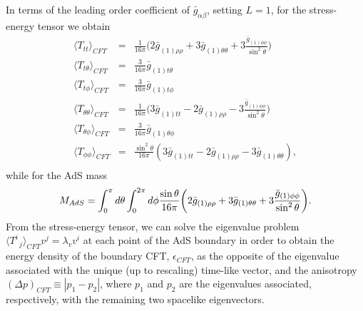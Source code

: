 \documentclass[a4paper,11pt]{article}
\begin{document}
In terms of the leading order coefficient of $\bar{g}_{\alpha\beta}$, setting $L=1$, for the stress-energy tensor we obtain
\begin{eqnarray}
\langle T_{tt}\rangle_{CFT}&=&\frac{1}{16\pi} \biggl(2\bar{g}_{(1)\rho\rho}+3\bar{g}_{(1)\theta\theta}+3\frac{\bar{g}_{(1)\phi\phi}}{\sin^2\theta}\biggr) \nonumber \\
\langle T_{t\theta}\rangle_{CFT}&=&\frac{3}{16\pi}\bar{g}_{(1)t\theta} \nonumber \\
\langle T_{t\phi}\rangle_{CFT}&=&\frac{3}{16\pi}\bar{g}_{(1)t\phi} \nonumber \\
\langle T_{\theta\theta}\rangle_{CFT}&=&\frac{1}{16\pi} \biggl(3\bar{g}_{(1)tt}-2\bar{g}_{(1)\rho\rho}-3\frac{\bar{g}_{(1)\phi\phi}}{\sin^2\theta}\biggr) \nonumber \\
\langle T_{\theta\phi}\rangle_{CFT}&=&\frac{3}{16\pi}\bar{g}_{(1)\theta\phi} \nonumber \\
\langle T_{\phi\phi}\rangle_{CFT}&=&\frac{\sin^2\theta}{16\pi} (3\bar{g}_{(1)tt}-2\bar{g}_{(1)\rho\rho}-3\bar{g}_{(1)\theta\theta}), \nonumber \\
\end{eqnarray}
while for the AdS mass
\begin{equation}
M_{AdS}=\int_0^\pi d\theta \int_0^{2\pi}d\phi\frac{\sin\theta}{16\pi} \biggl(2\bar{g}_{(1)\rho\rho}+3\bar{g}_{(1)\theta\theta}+3\frac{\bar{g}_{(1)\phi\phi}}{\sin^2\theta}\biggr) \nonumber. \\
\end{equation}
From the stress-energy tensor, we can solve the eigenvalue problem $\langle T^i_{\;\;j}\rangle_{CFT} v^j=\lambda_v v^i$ at each point of the AdS boundary in order to obtain the energy density of the boundary CFT, $\epsilon_{CFT}$, as the opposite of the eigenvalue associated with the unique (up to rescaling) time-like vector, and the anisotropy $(\Delta p)_{CFT}\equiv|p_1-p_2|$, where $p_1$ and $p_2$ are the eigenvalues associated, respectively, with the remaining two spacelike eigenvectors.
\end{document}

